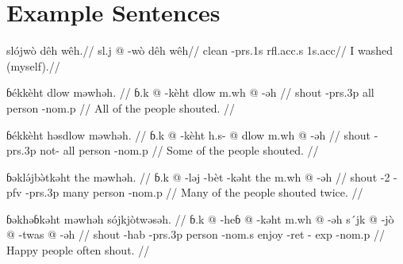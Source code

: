 \section{Example Sentences}

\ex
\begingl
\glpreamble slójwò dêh wêh.//
\gla sl.j @ -wò dêh wêh//
\glb clean -{\sc prs}.1s {\sc rfl}.{\sc acc}.s 1s.{\sc acc}//
\glft I washed (myself).//
\endgl
\xe

\pex
\a
\begingl
\glpreamble ɓékkèht dlow məwhəh. //
\gla ɓ.k @ -kèht dlow m.wh @ -əh //
\glb shout -{\sc prs}.3p all person -{\sc nom}.p //
\glft All of the people shouted. //
\endgl

\a
\begingl
\glpreamble ɓékkèht həsdlow məwhəh. //
\gla ɓ.k @ -kèht h.s- @ dlow m.wh @ -əh //
\glb shout -{\sc prs}.3p not- all person -{\sc nom}.p //
\glft Some of the people shouted. //
\endgl

\a
\begingl
\glpreamble ɓəklə́jbə̀tkəht the məwhəh. //
\gla ɓ.k @ -ləj -bèt -kəht the m.wh @ -əh //
\glb shout -2 -{\sc pfv} -{\sc prs}.3p many person -{\sc nom}.p //
\glft Many of the people shouted twice. //
\endgl

\a
\begingl
\glpreamble ɓəkhəɓkəht məwhəh sójkjòtwəsəh. //
\gla ɓ.k @ -heɓ @ -kəht m.wh @ -əh s´jk @ -jò @ -twas @ -əh //
\glb shout -{\sc hab} -{\sc prs}.3p person -{\sc nom}.s enjoy -{\sc ret} -{\sc
exp} -{\sc nom}.p //
\glft Happy people often shout. //
\endgl
\xe

